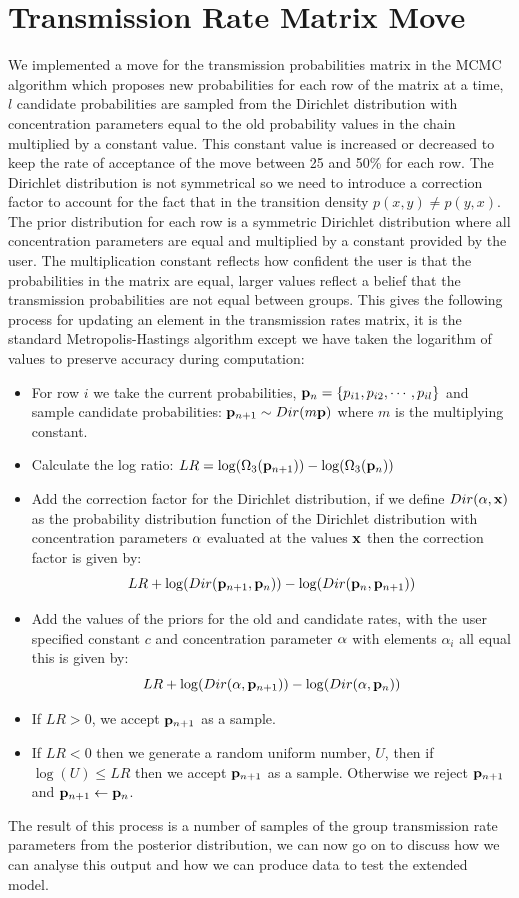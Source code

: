 \documentclass[11pt,a4paper]{report}
\begin{document}
\section{Transmission Rate Matrix Move}
We implemented a move for the transmission probabilities matrix in the MCMC algorithm which proposes new probabilities for each row of the matrix at a time, $l$ candidate probabilities are sampled from the Dirichlet distribution with concentration parameters equal to the old probability values in the chain multiplied by a constant value. This constant value is increased or decreased to keep the rate of acceptance of the move between 25 and 50\% for each row. The Dirichlet distribution is not symmetrical so we need to introduce a correction factor to account for the fact that in the transition density $p(x,y) \neq p(y,x)$. The prior distribution for each row is a symmetric Dirichlet distribution where all concentration parameters are equal and multiplied by a constant provided by the user. The multiplication constant reflects how confident the user is that the probabilities in the matrix are equal, larger values reflect a belief that the transmission probabilities are not equal between groups. This gives the following process for updating an element in the transmission rates matrix, it is the standard Metropolis-Hastings algorithm except we have taken the logarithm of values to preserve accuracy during computation:
\begin{itemize}
\item For row $i$ we take the current probabilities, ${\bf p}_{n} =  \{p_{i1},p_{i2}, \cdots,p_{il}\}$ and sample candidate probabilities: ${\bf p}_{n+1} \sim Dir(m{\bf p})$ where $m$ is the multiplying constant.
\item Calculate the log ratio: $ LR = \log(\Omega_3({\bf p}_{n+1})) - \log(\Omega_3({\bf p}_{n}))$
\item Add the correction factor for the Dirichlet distribution, if we define $Dir({\bf \alpha,x})$ as the probability distribution function of the Dirichlet distribution with concentration parameters ${\bf \alpha}$ evaluated at the values ${\bf x}$ then the correction factor is given by: 
\[ LR + \log(Dir({\bf p}_{n+1},{\bf p}_{n})) - \log(Dir({\bf p}_{n},{\bf p}_{n+1})) \]
\item Add the values of the priors for the old and candidate rates, with the user specified constant $c$ and concentration parameter ${\bf \alpha}$ with elements $\alpha_i$ all equal this is given by: 
\[ LR + \log(Dir({\bf \alpha},{\bf p}_{n+1})) - \log(Dir({\bf \alpha},{\bf p}_{n}))\]
\item If $LR > 0$, we accept ${\bf p}_{n+1}$ as a sample.
\item If $LR < 0$ then we generate a random uniform number, $U$, then if $\log(U) \leq LR$ then we accept ${\bf p}_{n+1}$ as a sample. Otherwise we reject ${\bf p}_{n+1}$ and ${\bf p}_{n+1} \leftarrow {\bf p}_{n}$.
\end{itemize}
The result of this process is a number of samples of the group transmission rate parameters from the posterior distribution, we can now go on to discuss how we can analyse this output and how we can produce data to test the extended model.
\end{document}
